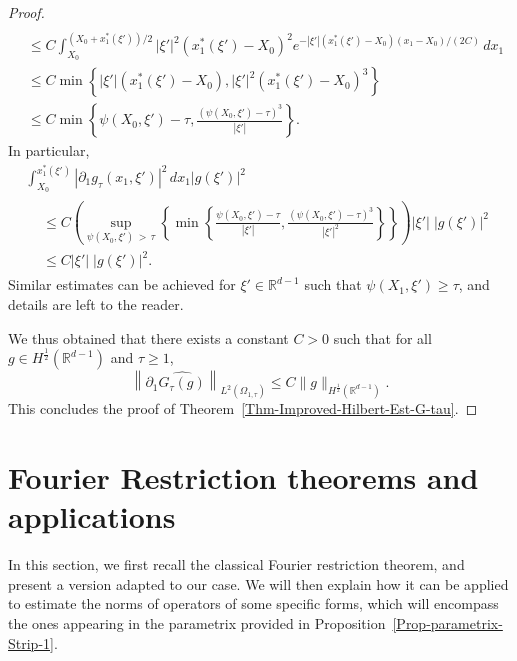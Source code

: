 \documentclass[AHL,Unicode,longabstracts]{cedram}
\newcommand*\R{\mathbb{R}}
\renewcommand{\leq}{\leqslant}
\renewcommand{\geq}{\geqslant}
\begin{document}
\begin{proof}
\begin{align*}
\\
& \leq C \int_{X_0}^{\left(X_0+x_1^*(\xi')\right)/2} |\xi'|^2 \left(x_1^*(\xi') - X_0\right)^2 e^{- |\xi'| \left(x_1^*(\xi') - X_0\right) (x_1 -X_0)/(2C)} \, dx_1
\\
& \leq C \min\left\{ |\xi'| (x_1^*(\xi') - X_0), |\xi'|^2 \left(x_1^*(\xi') - X_0\right)^3 \right\}
\\
&
\leq C \min\left\{ \psi(X_0, \xi') - \tau, \frac{(\psi(X_0,\xi') - \tau)^3}{|\xi'|} \right\}.
\end{align*}
In particular,
\begin{multline*}
\int_{X_0}^{x_1^*(\xi')} \left|\partial_1 g_\tau(x_1, \xi')\right|^2 \, dx_1 |g(\xi')|^2
\\
\begin{aligned}
&\leq C
\left(\!\sup_{\psi(X_0, \xi')\,>\,\tau} \left\{ \min\left\{ \frac{\psi(X_0, \xi') - \tau}{|\xi'|}, \frac{(\psi(X_0,\xi') \!-\! \tau)^3}{|\xi'|^2} \right\}\right\} \!\right) \left|\xi'\right|\; \left|g(\xi')\right|^2\\
&\leq \! C \left|\xi'\right|\; \left|g(\xi')\right|^2.
\end{aligned}
\end{multline*}
Similar estimates can be achieved for $\xi' \in \R^{d-1}$ such that $\psi(X_1, \xi') \geq \tau$, and details are left to the reader.

We thus obtained that there exists a constant $C>0$ such that for all $g \in H^{\frac{1}{2}}(\R^{d-1})$ and $\tau \geq 1$,
\begin{equation*}
\left\|\partial_1 \widehat{ G_{\tau} (g)} \right\|_{L^2(\Omega_{1,\tau})}
\leq C \| g \|_{H^{\frac{1}{2}}\left(\R^{d-1}\right)}.
\end{equation*}
This concludes the proof of Theorem~\ref{Thm-Improved-Hilbert-Est-G-tau}.
\end{proof}

\section{Fourier Restriction theorems and applications}\label{Sec-Fourier-Restriction-Thm}

In this section, we first recall the classical Fourier restriction theorem, and present a version adapted to our case. We will then explain how it can be applied to estimate the norms of operators of some specific forms, which will encompass the ones appearing in the parametrix provided in Proposition~\ref{Prop-parametrix-Strip-1}.
\end{document}
